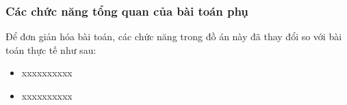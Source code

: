 \subsubsection{Các chức năng tổng quan của bài toán phụ}

Để đơn giản hóa bài toán, các chức năng trong đồ án này đã thay đổi so với bài toán thực tế như sau:

\begin{itemize}

\item xxxxxxxxxx

\item xxxxxxxxxx

\end{itemize}












% 









